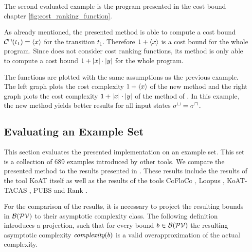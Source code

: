 The second evaluated example is the program presented in the cost bound chapter \ref{fig:cost_ranking_function}.



As already mentioned, the presented method is able to compute a cost bound ${\mathcal{C}^\sqcap}(t_1) = \left\langle x \right\rangle$ for the transition $t_1$.
Therefore $1 + \left\langle x \right\rangle$ is a cost bound for the whole program.
Since \cite{koat} does not consider cost ranking functions, its method is only able to compute a cost bound $1 + \left|x\right| \cdot \left|y\right|$ for the whole program.

The functions are plotted with the same assumptions as the previous example.
The left graph plots the cost complexity $1 + \left\langle x \right\rangle$ of the new method and the right graph plots the cost complexity $1 + \left|x\right| \cdot \left|y\right|$ of the method of \cite{koat}.
In this example, the new method yields better results for all input states ${\sigma^\sqcup} = {\sigma^\sqcap}$.

\subsection{Evaluating an Example Set}

This section evaluates the presented implementation on an example set.
This set is a collection of 689 examples introduced by other tools.
We compare the presented method to the results presented in \cite{koat}.
These results include the results of the tool KoAT itself as well as the results of the tools CoFloCo \cite{cofloco1, cofloco2}, Loopus \cite{loopus1, loopus2}, KoAT-TACAS \cite{leike2014ranking}, PUBS \cite{pubs1, pubs2} and Rank \cite{rank}.

For the comparison of the results, it is necessary to project the resulting bounds in $\mathcal{B}(\mathcal{PV})$ to their asymptotic complexity class.
The following definition introduces a projection, such that for every bound $b \in \mathcal{B}(\mathcal{PV})$ the resulting asymptotic complexity $\emph{complexity}(b)$ is a valid overapproximation of the actual complexity.


